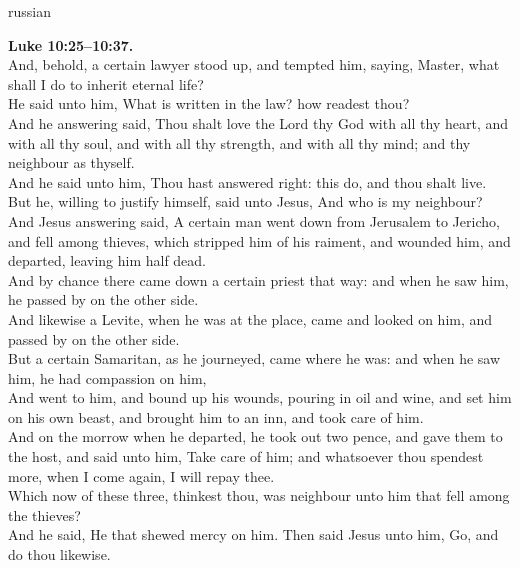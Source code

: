 \documentclass[10pt]{article} %
\begin{document}
{\begin{minipage}[t]{0.45\textwidth}
\begin{otherlanguage*}{russian}
\end{otherlanguage*}
\end{minipage}
\hfill
\begin{minipage}[t]{0.45\textwidth}

\textbf{Luke 10:25--10:37.}\\
And, behold, a certain lawyer stood up, and tempted him, saying, Master, what shall I do to inherit eternal life?\\
He said unto him, What is written in the law? how readest thou?\\
And he answering said, Thou shalt love the Lord thy God with all thy heart, and with all thy soul, and with all thy strength, and with all thy mind; and thy neighbour as thyself.\\
And he said unto him, Thou hast answered right: this do, and thou shalt live.\\
But he, willing to justify himself, said unto Jesus, And who is my neighbour?\\
And Jesus answering said, A certain man went down from Jerusalem to Jericho, and fell among thieves, which stripped him of his raiment, and wounded him, and departed, leaving him half dead.\\
And by chance there came down a certain priest that way: and when he saw him, he passed by on the other side.\\
And likewise a Levite, when he was at the place, came and looked on him, and passed by on the other side.\\
But a certain Samaritan, as he journeyed, came where he was: and when he saw him, he had compassion on him,\\
And went to him, and bound up his wounds, pouring in oil and wine, and set him on his own beast, and brought him to an inn, and took care of him.\\
And on the morrow when he departed, he took out two pence, and gave them to the host, and said unto him, Take care of him; and whatsoever thou spendest more, when I come again, I will repay thee.\\
Which now of these three, thinkest thou, was neighbour unto him that fell among the thieves?\\
And he said, He that shewed mercy on him. Then said Jesus unto him, Go, and do thou likewise.\\

\end{minipage}}
\vspace*{\fill}
\newpage
\huge%
\vspace*{\fill}
\end{document}

